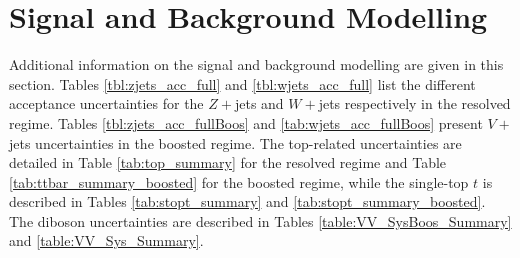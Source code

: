 \section{Signal and Background Modelling}\label{appsec-vh-backsigmod}
Additional information on the signal and background modelling are given in this section. Tables \ref{tbl:zjets_acc_full} and \ref{tbl:wjets_acc_full} list the different acceptance uncertainties for the $Z+$jets and $W+$jets respectively in the resolved regime. Tables \ref{tbl:zjets_acc_fullBoos} and \ref{tab:wjets_acc_fullBoos} present $V+$jets uncertainties in the boosted regime. The top-related uncertainties are detailed in Table \ref{tab:top_summary} for the resolved regime and Table \ref{tab:ttbar_summary_boosted} for the boosted regime, while the single-top $t$ is described in Tables \ref{tab:stopt_summary} and \ref{tab:stopt_summary_boosted}. The diboson uncertainties are described in Tables \ref{table:VV_SysBoos_Summary} and \ref{table:VV_Sys_Summary}.










